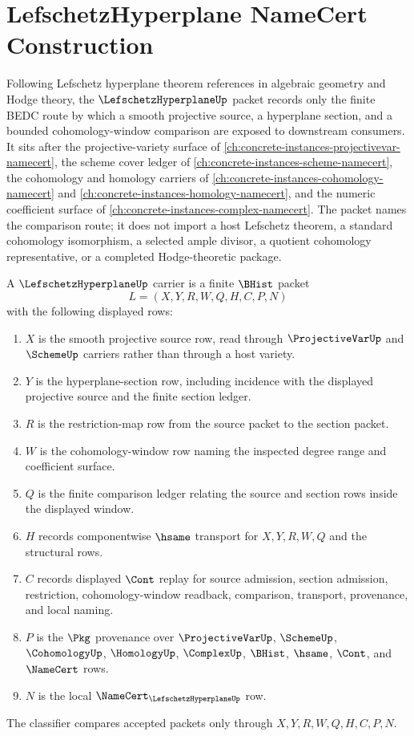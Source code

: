 \chapter{LefschetzHyperplane NameCert Construction}
\label{ch:concrete-instances-lefschetz-hyperplane-namecert}

Following Lefschetz hyperplane theorem references in algebraic geometry and Hodge theory, the $\LefschetzHyperplaneUp$ packet records only the finite BEDC route by which a smooth projective source, a hyperplane section, and a bounded cohomology-window comparison are exposed to downstream consumers. It sits after the projective-variety surface of \autoref{ch:concrete-instances-projectivevar-namecert}, the scheme cover ledger of \autoref{ch:concrete-instances-scheme-namecert}, the cohomology and homology carriers of \autoref{ch:concrete-instances-cohomology-namecert} and \autoref{ch:concrete-instances-homology-namecert}, and the numeric coefficient surface of \autoref{ch:concrete-instances-complex-namecert}. The packet names the comparison route; it does not import a host Lefschetz theorem, a standard cohomology isomorphism, a selected ample divisor, a quotient cohomology representative, or a completed Hodge-theoretic package.

\begin{definition}
\label{def:lefschetz-hyperplane-carrier}
A $\LefschetzHyperplaneUp$ carrier is a finite $\BHist$ packet
$$
L=(X,Y,R,W,Q,H,C,P,N)
$$
with the following displayed rows:
\begin{enumerate}
\item $X$ is the smooth projective source row, read through $\ProjectiveVarUp$ and $\SchemeUp$ carriers rather than through a host variety.
\item $Y$ is the hyperplane-section row, including incidence with the displayed projective source and the finite section ledger.
\item $R$ is the restriction-map row from the source packet to the section packet.
\item $W$ is the cohomology-window row naming the inspected degree range and coefficient surface.
\item $Q$ is the finite comparison ledger relating the source and section rows inside the displayed window.
\item $H$ records componentwise $\hsame$ transport for $X,Y,R,W,Q$ and the structural rows.
\item $C$ records displayed $\Cont$ replay for source admission, section admission, restriction, cohomology-window readback, comparison, transport, provenance, and local naming.
\item $P$ is the $\Pkg$ provenance over $\ProjectiveVarUp$, $\SchemeUp$, $\CohomologyUp$, $\HomologyUp$, $\ComplexUp$, $\BHist$, $\hsame$, $\Cont$, and $\NameCert$ rows.
\item $N$ is the local $\NameCert_{\LefschetzHyperplaneUp}$ row.
\end{enumerate}
The classifier compares accepted packets only through $X,Y,R,W,Q,H,C,P,N$.
\end{definition}

